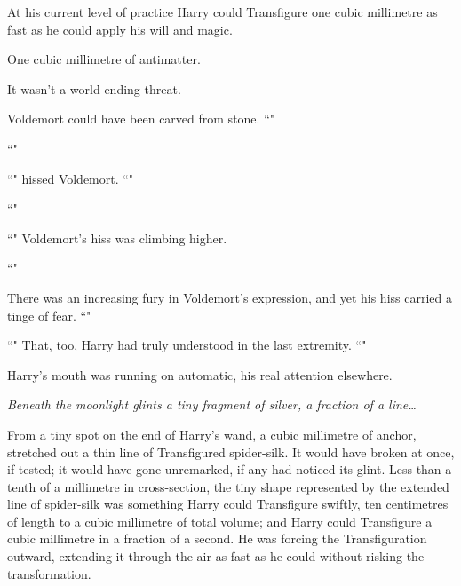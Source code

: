 At his current level of practice Harry could Transfigure one cubic millimetre as fast as he could apply his will and magic.

One cubic millimetre of antimatter.

It wasn't a world-ending threat.

Voldemort could have been carved from stone. ``"

``"

``" hissed Voldemort. ``"

``"

``" Voldemort's hiss was climbing higher.

``"

There was an increasing fury in Voldemort's expression, and yet his hiss carried a tinge of fear. ``"

``" That, too, Harry had truly understood in the last extremity. ``"

Harry's mouth was running on automatic, his real attention elsewhere.

\emph{Beneath the moonlight glints a tiny fragment of silver, a fraction of a line{\ldots}}

From a tiny spot on the end of Harry's wand, a cubic millimetre of anchor, stretched out a thin line of Transfigured spider-silk. It would have broken at once, if tested; it would have gone unremarked, if any had noticed its glint. Less than a tenth of a millimetre in cross-section, the tiny shape represented by the extended line of spider-silk was something Harry could Transfigure swiftly, ten centimetres of length to a cubic millimetre of total volume; and Harry could Transfigure a cubic millimetre in a fraction of a second. He was forcing the Transfiguration outward, extending it through the air as fast as he could without risking the transformation.


